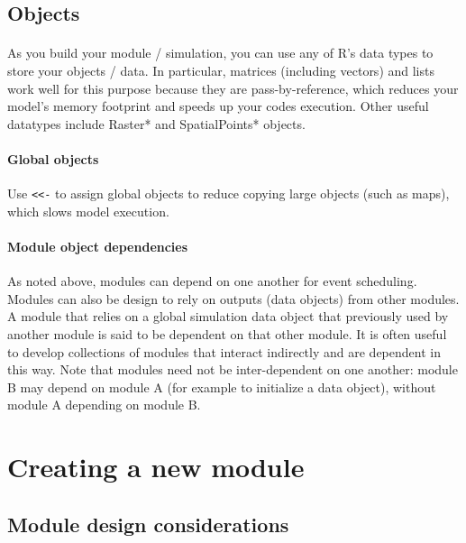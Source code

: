 \documentclass{article}
\begin{document}
\subsection{Objects}

\paragraph{}
As you build your module / simulation, you can use any of \textsf{R}'s data types to store your objects / data. In particular, matrices (including vectors) and lists work well for this purpose because they are pass-by-reference, which reduces your model's memory footprint and speeds up your codes execution. Other useful datatypes include Raster* and SpatialPoints* objects.

\paragraph{Global objects}
Use \texttt{<<-} to assign global objects to reduce copying large objects (such as maps), which slows model execution.

\paragraph{Module object dependencies}
As noted above, modules can depend on one another for event scheduling. Modules can also be design to rely on outputs (data objects) from other modules. A module that relies on a global simulation data object that previously used by another module is said to be dependent on that other module. It is often useful to develop collections of modules that interact indirectly and are dependent in this way. Note that modules need not be inter-dependent on one another: module B may depend on module A (for example to initialize a data object), without module A depending on module B.

\newpage

\section{Creating a new module}

\subsection{Module design considerations}

\paragraph{}
\textit{\color{blue}{perhaps a bit about design phlosophy, relating back to dependencies and how to carefully build modules that actually retain modularity.}}
\end{document}
